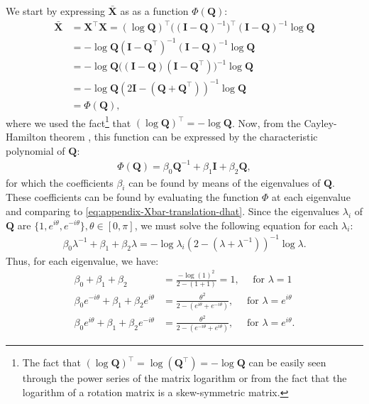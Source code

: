 We start by expressing $\bar{\mathbf{X}}$ as as a function $\Phi(\mathbf{Q})$:
\begin{align}
    \bar{\mathbf{X}} &= \mathbf{X}^\top\mathbf{X} = (\log\mathbf{Q})^\top\bigl((\mathbf{I} - \mathbf{Q})^{-1}\bigr)^\top(\mathbf{I} - \mathbf{Q})^{-1}\log\mathbf{Q}\\
    &= -\log\mathbf{Q}(\mathbf{I} - \mathbf{Q}^\top)^{-1}(\mathbf{I} - \mathbf{Q})^{-1}\log\mathbf{Q}\\
    &=-\log\mathbf{Q}\bigl((\mathbf{I} - \mathbf{Q})(\mathbf{I} - \mathbf{Q}^\top)\bigr)^{-1}\log\mathbf{Q}\\
    &=-\log\mathbf{Q}(2\mathbf{I}-(\mathbf{Q}+\mathbf{Q}^\top))^{-1}\log\mathbf{Q} \label{eq:appendix-Xbar-translation-dhat}\\
    &= \Phi(\mathbf{Q}),
\end{align}
where we used the fact\footnote{The fact that $(\log\mathbf{Q})^\top = \log(\mathbf{Q}^\top) = -\log\mathbf{Q}$ can be easily seen through the power series of the matrix logarithm or from the fact that the logarithm of a rotation matrix is a skew-symmetric matrix.} that $(\log\mathbf{Q})^\top=-\log\mathbf{Q}$. Now, from the Cayley-Hamilton theorem \citep[p. 63]{Chen2009}, this function can be expressed by the characteristic polynomial of $\mathbf{Q}$:
\begin{align}
    \Phi(\mathbf{Q}) = \beta_0\mathbf{Q}^{-1} + \beta_1\mathbf{I} + \beta_2\mathbf{Q},
\end{align}
for which the coefficients $\beta_i$ can be found by means of the eigenvalues of $\mathbf{Q}$. These coefficients can be found by evaluating the function $\Phi$ at each eigenvalue and comparing to \eqref{eq:appendix-Xbar-translation-dhat}. Since the eigenvalues $\lambda_i$ of $\mathbf{Q}$ are $\{1, e^{i\theta}, e^{-i\theta}\},\theta\in[0,\pi]$, we must solve the following equation for each $\lambda_i$:
\begin{align}
    \beta_0\lambda^{-1} + \beta_1 + \beta_2\lambda = -\log\lambda_i(2-(\lambda+\lambda^{-1}))^{-1}\log\lambda.
\end{align}
Thus, for each eigenvalue, we have:
\begin{align}
        \beta_0 + \beta_1 + \beta_2 &= \frac{-\log(1)^2}{2 - (1+1)}=1,\quad\text{ for }\lambda = 1 \label{eq:appendix-cayley-lambda1}\\
        \beta_0 e^{-i\theta} + \beta_1 + \beta_2 e^{i\theta} &= \frac{\theta^2}{2 - (e^{i\theta}+ e^{-i\theta})},\quad\text{ for }\lambda = e^{i\theta} \label{eq:appendix-cayley-lambdaeitheta}\\ 
        \beta_0 e^{i\theta} + \beta_1 + \beta_2 e^{-i\theta} &= \frac{\theta^2}{2 - (e^{-i\theta}+ e^{i\theta})},\quad\text{ for }\lambda = e^{i\theta}. \label{eq:appendix-cayley-lambdaMINUSeitheta}
\end{align}
